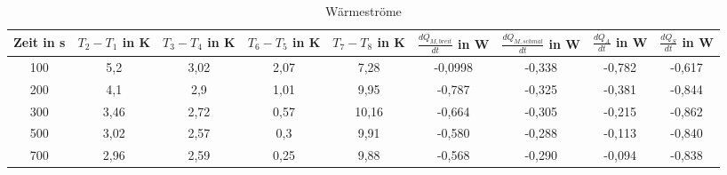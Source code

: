 \begin{table}[H]
  \tiny
  \centering
  \caption{Wärmeströme}
  \label{tab:3}
  \begin{tabular}{c c c c c c c c c}
  \toprule
  Zeit in s & $T_2 - T_1$ in K & $T_3 - T_4$ in K  & $T_6 - T_5$ in K  & $T_7 - T_8$ in K  & $\frac{dQ_{M,breit}}{dt}$ in W & $\frac{dQ_{M,schmal}}{dt}$ in W & $\frac{dQ_{A}}{dt}$ in W & $\frac{dQ_{S}}{dt}$ in W\\
  \midrule
    100 & 5,2 & 3,02 &2,07 & 7,28&-0,0998&-0,338&-0,782&-0,617\\
    200 & 4,1 & 2,9 &1,01&9,95&-0,787&-0,325&-0,381&-0,844\\
    300 & 3,46 & 2,72 &0,57&10,16&-0,664 &-0,305&-0,215&-0,862\\
    500 & 3,02 & 2,57 &0,3&9,91&-0,580&-0,288&-0,113&-0,840\\
    700 & 2,96 & 2,59 &0,25&9,88&-0,568&-0,290 &-0,094 & -0,838\\
  \bottomrule
\end{tabular}
\end{table}
